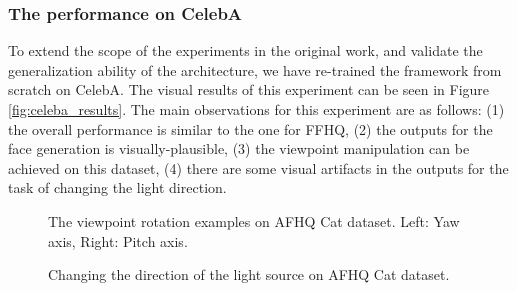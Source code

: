 



\subsubsection{The performance on CelebA}
To extend the scope of the experiments in the original work, and validate the generalization ability of the architecture, we have re-trained the framework from scratch on CelebA. The visual results of this experiment can be seen in Figure \ref{fig:celeba_results}. The main observations for this experiment are as follows: (1) the overall performance is similar to the one for FFHQ, (2) the outputs for the face generation is visually-plausible, (3) the viewpoint manipulation can be achieved on this dataset, (4) there are some visual artifacts in the outputs for the task of changing the light direction.


\begin{figure}[h!]%
    \centering
    \qquad
    \caption{The viewpoint rotation examples on AFHQ Cat dataset. Left: Yaw axis, Right: Pitch axis.}%
    \label{fig:afhq_view}%
\end{figure}

\begin{figure}[h!]%
    \centering
    \qquad
    \caption{Changing the direction of the light source on AFHQ Cat dataset.}%
    \label{fig:afhq_light}%
\end{figure}

